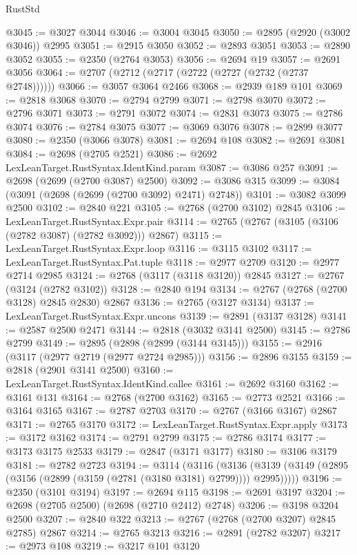 \begin{lexlean}{RustStd}
\begin{coremodule}
@3045 := @3027 @3044
@3046 := @3004 @3045
@3050 := @2895 (@2920 (@3002 @3046)) @2995
@3051 := @2915 @3050
@3052 := @2893 @3051
@3053 := @2890 @3052
@3055 := @2350 (@2764 @3053)
@3056 := @2694 @19
@3057 := @2691 @3056
@3064 := @2707 (@2712 (@2717 (@2722 (@2727 (@2732 (@2737 @2748))))))
@3066 := @3057 @3064 @2466
@3068 := @2939 @189 @101
@3069 := @2818 @3068
@3070 := @2794 @2799
@3071 := @2798 @3070
@3072 := @2796 @3071
@3073 := @2791 @3072
@3074 := @2831 @3073
@3075 := @2786 @3074
@3076 := @2784 @3075
@3077 := @3069 @3076
@3078 := @2899 @3077
@3080 := @2350 (@3066 @3078)
@3081 := @2694 @108
@3082 := @2691 @3081
@3084 := @2698 (@2705 @2521)
@3086 := @2692 LexLeanTarget.RustSyntax.IdentKind.param
@3087 := @3086 @257
@3091 := @2698 (@2699 (@2700 @3087) @2500)
@3092 := @3086 @315
@3099 := @3084 (@3091 (@2698 (@2699 (@2700 @3092) @2471) @2748))
@3101 := @3082 @3099 @2500
@3102 := @2840 @221
@3105 := @2768 (@2700 @3102) @2845
@3106 := LexLeanTarget.RustSyntax.Expr.pair
@3114 := @2765 (@2767 (@3105 (@3106 (@2782 @3087) (@2782 @3092))) @2867)
@3115 := LexLeanTarget.RustSyntax.Expr.loop
@3116 := @3115 @3102
@3117 := LexLeanTarget.RustSyntax.Pat.tuple
@3118 := @2977 @2709
@3120 := @2977 @2714 @2985
@3124 := @2768 (@3117 (@3118 @3120)) @2845
@3127 := @2767 (@3124 (@2782 @3102))
@3128 := @2840 @194
@3134 := @2767 (@2768 (@2700 @3128) @2845 @2830) @2867
@3136 := @2765 (@3127 @3134)
@3137 := LexLeanTarget.RustSyntax.Expr.uncons
@3139 := @2891 (@3137 @3128)
@3141 := @2587 @2500 @2471
@3144 := @2818 (@3032 @3141 @2500)
@3145 := @2786 @2799
@3149 := @2895 (@2898 (@2899 (@3144 @3145)))
@3155 := @2916 (@3117 (@2977 @2719 (@2977 @2724 @2985)))
@3156 := @2896 @3155
@3159 := @2818 (@2901 @3141 @2500)
@3160 := LexLeanTarget.RustSyntax.IdentKind.callee
@3161 := @2692 @3160
@3162 := @3161 @131
@3164 := @2768 (@2700 @3162)
@3165 := @2773 @2521
@3166 := @3164 @3165
@3167 := @2787 @2703
@3170 := @2767 (@3166 @3167) @2867
@3171 := @2765 @3170
@3172 := LexLeanTarget.RustSyntax.Expr.apply
@3173 := @3172 @3162
@3174 := @2791 @2799
@3175 := @2786 @3174
@3177 := @3173 @3175 @2533
@3179 := @2847 (@3171 @3177)
@3180 := @3106 @3179
@3181 := @2782 @2723
@3194 := @3114
    (@3116
      (@3136 (@3139 (@3149 (@2895 (@3156 (@2899 (@3159 (@2781 (@3180 @3181) @2799)))) @2995)))))
@3196 := @2350 (@3101 @3194)
@3197 := @2694 @115
@3198 := @2691 @3197
@3204 := @2698 (@2705 @2500) (@2698 (@2710 @2412) @2748)
@3206 := @3198 @3204 @2500
@3207 := @2840 @322
@3213 := @2767 (@2768 (@2700 @3207) @2845 @2785) @2867
@3214 := @2765 @3213
@3216 := @2891 (@2782 @3207)
@3217 := @2973 @108
@3219 := @3217 @101 @3120

\end{coremodule}
\end{lexlean}
